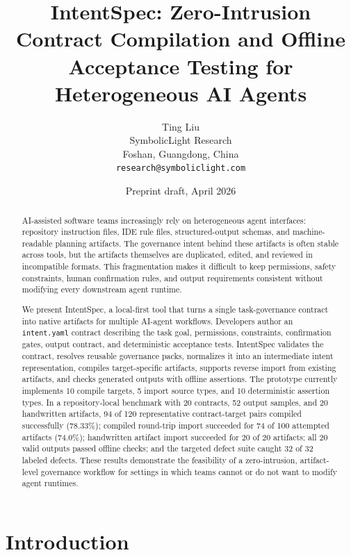 \documentclass[11pt]{article}
\title{IntentSpec: Zero-Intrusion Contract Compilation and Offline Acceptance Testing for Heterogeneous AI Agents}
\author{Ting Liu\\
SymbolicLight Research\\
Foshan, Guangdong, China\\
\texttt{research@symboliclight.com}}
\date{Preprint draft, April 2026}
\begin{document}
\maketitle

\begin{abstract}
AI-assisted software teams increasingly rely on heterogeneous agent interfaces:
repository instruction files, IDE rule files, structured-output schemas, and
machine-readable planning artifacts. The governance intent behind these artifacts is
often stable across tools, but the artifacts themselves are duplicated, edited, and
reviewed in incompatible formats. This fragmentation makes it difficult to keep
permissions, safety constraints, human confirmation rules, and output requirements
consistent without modifying every downstream agent runtime.

We present IntentSpec, a local-first tool that turns a single task-governance
contract into native artifacts for multiple AI-agent workflows. Developers author an
\texttt{intent.yaml} contract describing the task goal, permissions, constraints,
confirmation gates, output contract, and deterministic acceptance tests. IntentSpec
validates the contract, resolves reusable governance packs, normalizes it into an
intermediate intent representation, compiles target-specific artifacts, supports
reverse import from existing artifacts, and checks generated outputs with offline
assertions. The prototype currently implements 10 compile targets, 5 import source
types, and 10 deterministic assertion types. In a repository-local benchmark with
20 contracts, 52 output samples, and 20 handwritten artifacts, 94 of 120
representative contract-target pairs compiled successfully (78.33\%); compiled
round-trip import succeeded for 74 of 100 attempted artifacts (74.0\%);
handwritten artifact import succeeded for 20 of 20 artifacts; all 20 valid outputs
passed offline checks; and the targeted defect suite caught 32 of 32 labeled
defects. These results demonstrate
the feasibility of a zero-intrusion, artifact-level governance workflow for
settings in which teams cannot or do not want to modify agent runtimes.
\end{abstract}

\section{Introduction}
\end{document}
